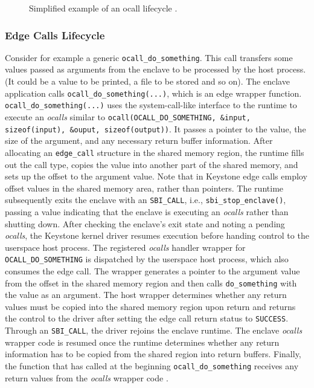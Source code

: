\begin{figure}[h!]
    \centering
    
    \caption{Simplified example of an ocall lifecycle \cite{keystone-doc}.}
    \label{ocall-lifecycle}
\end{figure}

\subsubsection{Edge Calls Lifecycle}
Consider for example a generic \texttt{ocall\_do\_something}. This call transfers some values passed as arguments from the enclave to be processed by the host process. (It could be a value to be printed, a file to be stored and so on). The enclave application calls \texttt{ocall\_do\_something(...)}, which is an edge wrapper function.
\texttt{ocall\_do\_something(...)} uses the system-call-like interface to the runtime to execute an \textit{ocalls} similar to \texttt{ocall(OCALL\_DO\_SOMETHING, \&input, sizeof(input), \&ouput,  sizeof(output))}. It passes a pointer to the value, the size of the argument, and any necessary return buffer information. 
After allocating an \texttt{edge\_call} structure in the shared memory region, the runtime fills out the call type, copies the value into another part of the shared memory, and sets up the offset to the argument value. Note that in Keystone edge calls employ offset values in the shared memory area, rather than pointers.
The runtime subsequently exits the enclave with an \texttt{SBI\_CALL}, i.e., \texttt{sbi\_stop\_enclave()}, passing a value indicating that the enclave is executing an \textit{ocalls} rather than shutting down. 
After checking the enclave's exit state and noting a pending \textit{ocalls}, the Keystone kernel driver resumes execution before handing control to the userspace host process. 
The registered \textit{ocalls} handler wrapper for \texttt{OCALL\_DO\_SOMETHING} is dispatched by the userspace host process, which also consumes the edge call. The wrapper generates a pointer to the argument value from the offset in the shared memory region and then calls \texttt{do\_something} with the value as an argument. The host wrapper determines whether any return values must be copied into the shared memory region upon return and returns the control to the driver after setting the edge call return status to \texttt{SUCCESS}. Through an \texttt{SBI\_CALL}, the driver rejoins the enclave runtime. The enclave \textit{ocalls} wrapper code is resumed once the runtime determines whether any return information has to be copied from the shared region into return buffers. Finally, the function that has called at the beginning \texttt{ocall\_do\_something} receives any return values from the \textit{ocalls} wrapper code \cite{keystone-doc}.


